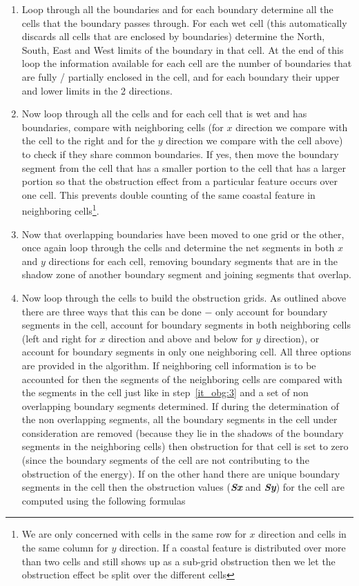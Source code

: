 \documentclass[12pt]{article}
\begin{document}
\renewcommand{\labelenumi}{Step~\theenumi:}
\begin{enumerate}
\item Loop through all the boundaries and for each boundary determine all the cells that the boundary passes through. For each wet cell (this automatically discards all cells that are enclosed by boundaries) determine the North, South, East and West limits of the boundary in that cell. At the end of this loop the information available for each cell are the number of boundaries that are fully / partially enclosed in the cell, and for each boundary their upper and lower limits in the 2 directions.\label{it_obg:1}
\item Now loop through all the cells and for each cell that is wet and has boundaries, compare with neighboring cells (for $x$ direction we compare with the cell to the right and for the $y$ direction we compare with the cell above) to check if they share common boundaries. If yes, then move the boundary segment from the cell that has a smaller portion to the cell that has a larger portion so that the obstruction effect from a particular feature occurs over one cell. This prevents double counting of the same coastal feature in neighboring cells\footnote{We are only concerned with cells in the same row for $x$ direction and cells in the same column for $y$ direction. If a coastal feature is distributed over more than two cells and still shows up as a sub-grid obstruction then we let the obstruction effect be split over the different cells}. \label{it_obg:2}
\item Now that overlapping boundaries have been moved to one grid or the other, once again loop through the cells and determine the net segments in both $x$ and $y$ directions for each cell, removing boundary segments that are in the shadow zone of another boundary segment and joining segments that overlap. \label{it_obg:3}
\item Now loop through the cells to build the obstruction grids. As outlined above there are three ways that this can be done $-$ only account for boundary segments in the cell, account for boundary segments in both neighboring cells (left and right for $x$ direction and above and below for $y$ direction), or account for boundary segments in only one neighboring cell. All three options are provided in the algorithm. If neighboring cell information is to be accounted for then the segments of the neighboring cells are compared with the segments in the cell just like in step~\ref{it_obg:3} and a set of non overlapping boundary segments determined. If during the determination of the non overlapping segments, all the boundary segments in the cell under consideration are removed (because they lie in the shadows of the boundary segments in the neighboring cells) then obstruction for that cell is set to zero (since the boundary segments of the cell are not contributing to the obstruction of the energy). If on the other hand there are unique boundary segments in the cell then the obstruction values (\textbf{\textit{Sx}} and \textbf{\textit{Sy}}) for the cell are computed using the following formulas

\end{enumerate}
\end{document}

